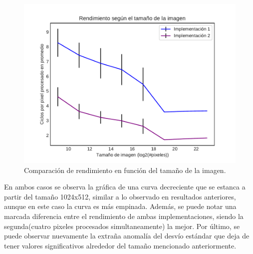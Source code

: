 \documentclass[a4paper]{article}
\begin{document}
\begin{figure}[h]
	\centering
	\includegraphics[scale=0.60]{img/ReforzarBrillo2vs4.pdf}
	\caption{Comparación de rendimiento en función del tamaño de la imagen.}
\end{figure}	
\justify
En ambos casos se observa la gráfica de una curva decreciente que se estanca a partir del tamaño 1024x512, similar a lo observado en resultados anteriores, aunque en este caso la curva es más empinada. Además, se puede notar una marcada diferencia entre el rendimiento de ambas implementaciones, siendo la segunda(cuatro pixeles procesados simultaneamente) la mejor. Por último, se puede observar nuevamente la extraña anomalía del desvío estándar que deja de tener valores significativos alrededor del tamaño mencionado anteriormente.
\end{document}
